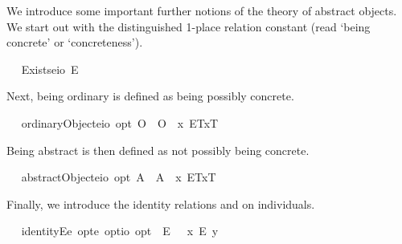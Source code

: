 \begin{isabellebody}
\begin{isamarkuptext}
We introduce some important further notions of the theory of abstract objects. We 
  start out with the distinguished 1-place relation constant  (read ‘being concrete’ or ‘concreteness’).%
\end{isamarkuptext}%
\isamarkuptrue%
\ \isamarkupfalse%
\ Exists{\isacharcolon}{\isacharcolon}{\isachardoublequoteopen}{\isacharparenleft}e{\isasymRightarrow}io{\isacharparenright}{\isachardoublequoteclose}\ {\isacharparenleft}{\isachardoublequoteopen}E{\isacharbang}{\isachardoublequoteclose}{\isacharparenright}%
\begin{isamarkuptext}%
Next, being ordinary is defined as being possibly concrete.%
\end{isamarkuptext}%
\isamarkuptrue%
\ \isamarkupfalse%
\ ordinaryObject{\isacharcolon}{\isacharcolon}{\isachardoublequoteopen}{\isacharparenleft}e{\isasymRightarrow}io{\isacharparenright}\ opt{\isachardoublequoteclose}\ {\isacharparenleft}{\isachardoublequoteopen}O{\isacharbang}{\isachardoublequoteclose}{\isacharparenright}\ \ {\isachardoublequoteopen}O{\isacharbang}\ {\isasymequiv}\ \isactrlbold {\isasymlambda}x{\isachardot}\ \isactrlbold {\isasymdiamond}{\isasymlparr}E{\isacharbang}\isactrlsup T{\isacharcomma}x\isactrlsup T{\isasymrparr}{\isachardoublequoteclose}%
\begin{isamarkuptext}%
Being abstract is then defined as not possibly being concrete.%
\end{isamarkuptext}%
\isamarkuptrue%
\ \isamarkupfalse%
\ abstractObject{\isacharcolon}{\isacharcolon}{\isachardoublequoteopen}{\isacharparenleft}e{\isasymRightarrow}io{\isacharparenright}\ opt{\isachardoublequoteclose}\ {\isacharparenleft}{\isachardoublequoteopen}A{\isacharbang}{\isachardoublequoteclose}{\isacharparenright}\ \ {\isachardoublequoteopen}A{\isacharbang}\ {\isasymequiv}\ \isactrlbold {\isasymlambda}x{\isachardot}\ \isactrlbold {\isasymnot}{\isacharparenleft}\isactrlbold {\isasymdiamond}{\isasymlparr}E{\isacharbang}\isactrlsup T{\isacharcomma}x\isactrlsup T{\isasymrparr}{\isacharparenright}{\isachardoublequoteclose}%
\begin{isamarkuptext}%
Finally, we introduce the identity relations  and \isa{\isactrlbold {\isacharequal}} on individuals.%
\end{isamarkuptext}%
\isamarkuptrue%
\ \isamarkupfalse%
\ identityE{\isacharcolon}{\isacharcolon}{\isachardoublequoteopen}e\ opt{\isasymRightarrow}e\ opt{\isasymRightarrow}io\ opt{\isachardoublequoteclose}\ {\isacharparenleft}\ {\isachardoublequoteopen}\isactrlbold {\isacharequal}\isactrlsub E{\isachardoublequoteclose}\ {}{}{\isacharparenright}\ \ {\isachardoublequoteopen}x\ \isactrlbold {\isacharequal}\isactrlsub E\ y\ {\isasymequiv}\ \isanewline

\end{isabellebody}
